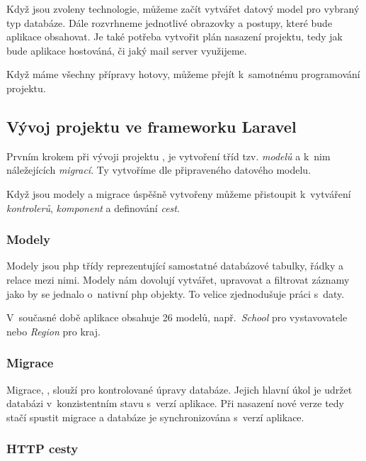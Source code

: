 Když jsou zvoleny technologie, můžeme začít vytvářet datový model pro vybraný typ databáze.
Dále rozvrhneme jednotlivé obrazovky a postupy, které bude aplikace obsahovat.
Je také potřeba vytvořit plán nasazení projektu, tedy jak bude aplikace hostováná, či jaký mail server využijeme.

Když máme všechny přípravy hotovy, můžeme přejít k~samotnému programování projektu.

\subsection{Vývoj projektu ve frameworku Laravel}
\label{sub:laravel-development}

Prvním krokem při vývoji projektu \inlaravel, je vytvoření tříd tzv. \emph{modelů}\cite{laravel-models} a k~nim náležejících \emph{migrací}\cite{laravel-migrations}. Ty vytvoříme dle připraveného datového modelu.

Když jsou modely a migrace úspěšně vytvořeny můžeme přistoupit k~vytváření \emph{kontrolerů}\cite{laravel-controller}, \emph{komponent}\cite{laravel-blade-component} a definování \emph{cest}\cite{laravel-routes}.

\subsubsection{Modely}

Modely jsou \acrshort{php} třídy reprezentující samostatné databázové tabulky, řádky a relace mezi nimi. Modely nám dovolují vytvářet, upravovat a filtrovat záznamy jako by se jednalo o~nativní \acrshort{php} objekty. To velice zjednodušuje práci s~daty.

V~současné době aplikace \bso{} obsahuje 26 modelů, např.~\emph{School} pro vystavovatele nebo \emph{Region} pro kraj. 

\subsubsection{Migrace}

Migrace, \inlaravel, slouží pro kontrolované úpravy databáze. Jejich hlavní úkol je udržet databázi v~konzistentním stavu s~verzí aplikace. Při nasazení nové verze tedy stačí spustit migrace a databáze je synchronizována s~verzí aplikace.

\subsubsection{HTTP cesty}

